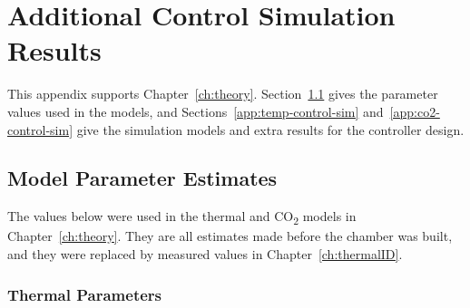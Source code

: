 \chapter{Additional Control Simulation Results}
\label{app:control-results}
 
This appendix supports Chapter~\ref{ch:theory}. Section~\ref{app:model-parameters} gives the parameter values used in the models, and Sections~\ref{app:temp-control-sim} and~\ref{app:co2-control-sim} give the simulation models and extra results for the controller design.

\section{Model Parameter Estimates}
\label{app:model-parameters}

The values below were used in the thermal and CO\textsubscript{2} models in Chapter~\ref{ch:theory}. They are all estimates made before the chamber was built, and they were replaced by measured values in Chapter~\ref{ch:thermalID}.

\subsection{Thermal Parameters}
\label{app:thermal-parameters}

